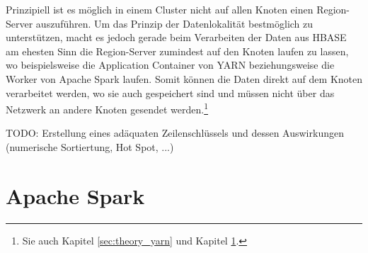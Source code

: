 \noindent
Prinzipiell ist es möglich in einem Cluster nicht auf allen Knoten einen Region-Server auszuführen. Um das Prinzip der Datenlokalität bestmöglich zu unterstützen, macht es jedoch gerade beim Verarbeiten der Daten aus HBASE am ehesten Sinn die Region-Server zumindest auf den Knoten laufen zu lassen, wo beispielsweise die Application Container von YARN beziehungsweise die Worker von Apache Spark laufen. Somit können die Daten direkt auf dem Knoten verarbeitet werden, wo sie auch gespeichert sind und müssen nicht über das Netzwerk an andere Knoten gesendet werden.\footnote{Sie auch Kapitel \ref{sec:theory_yarn} und Kapitel \ref{sec:theory_spark}.}

\noindent
TODO: Erstellung eines adäquaten Zeilenschlüssels und dessen Auswirkungen (numerische Sortiertung, Hot Spot, ...)
\section{Apache Spark}
\label{sec:theory_spark}
